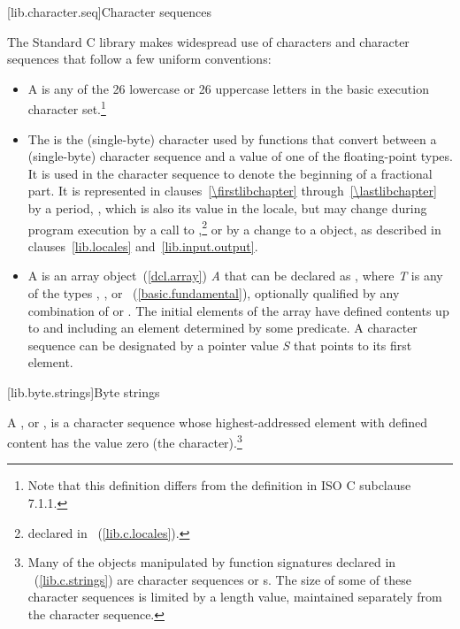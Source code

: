[lib.character.seq]{Character sequences}

\pnum
The Standard C library makes widespread use
%
of characters and character sequences that follow a few uniform conventions:

\begin{itemize}
\item
A
is any of the 26 lowercase or 26
%
%
uppercase letters in the basic execution character set.\footnote{Note that
this definition differs from the definition in ISO C subclause 7.1.1.}
\item
The
is the
%
(single-byte) character used by functions that convert between a (single-byte)
character sequence and a value of one of the floating-point types.
It is used
in the character sequence to denote the beginning of a fractional part.
It is
represented in clauses~\ref{\firstlibchapter} through~\ref{\lastlibchapter}
by a period,
%
,
which is
also its value in the 
locale, but may change during program
execution by a call to
,\footnote{declared in
~(\ref{lib.c.locales}).
%
%
%
}
or by a change to a
object, as described in clauses~\ref{lib.locales} and~\ref{lib.input.output}.
\item
A
is an array object~(\ref{dcl.array}) \textit{A} that
can be declared as
,
where \textit{T} is any of the types
,
,
or
~(\ref{basic.fundamental}), optionally qualified by any combination of
or
.
The initial elements of the
array have defined contents up to and including an element determined by some
predicate.
A character sequence can be designated by a pointer value
\textit{S} that points to its first element.
\end{itemize}

[lib.byte.strings]{Byte strings}

\pnum
A
%
%
,
or \term{\ntbs},
is a character sequence whose highest-addressed element
with defined content has the value zero
(the
character).\footnote{Many of the objects manipulated by
function signatures declared in
~(\ref{lib.c.strings}) are character sequences or \ntbs{}s.
%
%
The size of some of these character sequences is limited by
a length value, maintained separately from the character sequence.}

